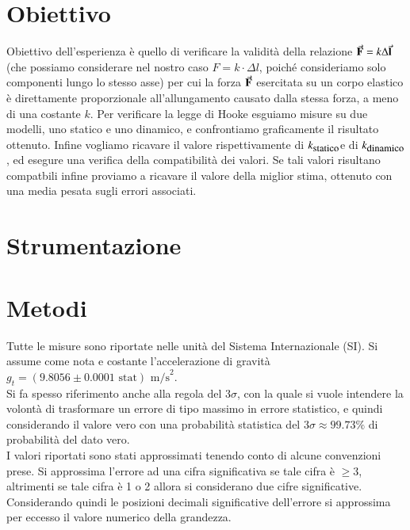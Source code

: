 \documentclass[italian, a4paper, 10pt, twocolumn]{../../style/lab_unige}
\newcommand{\gLab}{$g_t=(9.8056\pm0.0001 \text{ stat}) \text{ m/s}^2$\space}
\newcommand{\ks}{$k_{\text{\small statico}}$\space}
\newcommand{\kd}{$k_{\text{\small dinamico}}$\space}
\newcommand{\treSigma}{$3\sigma$\space}
\newcommand{\hookeLaw}{$F=k\cdot\Delta l$\space}
\begin{document}
    \section{Obiettivo}
    \label{section:aim}
    Obiettivo dell'esperienza è quello di verificare la validità della relazione $\va{F}=k\Delta\va{l}$ (che 
    possiamo considerare nel nostro caso \hookeLaw , poiché consideriamo solo componenti lungo lo stesso asse) 
    per cui la forza $\va{F}$ esercitata su un corpo elastico è direttamente proporzionale all'allungamento 
    causato dalla stessa forza, a meno di una costante $k$.
    Per verificare la legge di Hooke esguiamo misure su due modelli, uno statico e uno dinamico, e confrontiamo 
    graficamente il risultato ottenuto. Infine vogliamo ricavare il valore rispettivamente di \ks e di \kd, ed
    esegure una verifica della compatibilità dei valori. Se tali valori risultano compatbili infine proviamo a 
    ricavare il valore della miglior stima, ottenuto con una media pesata sugli errori associati.

    \section{Strumentazione}
    \label{section:strument}

    \section{Metodi}
    \label{section:methods}
    Tutte le misure sono riportate nelle unità del Sistema Internazionale (SI). Si assume come nota e costante 
    l'accelerazione di gravità \gLab .\\

    Si fa spesso riferimento anche alla regola del \treSigma, con la quale si vuole intendere la volontà di 
    trasformare un errore di tipo massimo in errore statistico, e quindi considerando il valore vero con una
    probabilità statistica del \treSigma $\approx99.73\%$ di probabilità del dato vero.\\
    I valori riportati sono stati approssimati tenendo conto di alcune convenzioni prese. Si approssima 
    l'errore ad una cifra significativa se tale cifra è $\geqslant3$, altrimenti se tale cifra è 1 o 2 allora
    si considerano due cifre significative. Considerando quindi le posizioni decimali significative dell'errore
    si approssima per eccesso il valore numerico della grandezza. 
\end{document}

